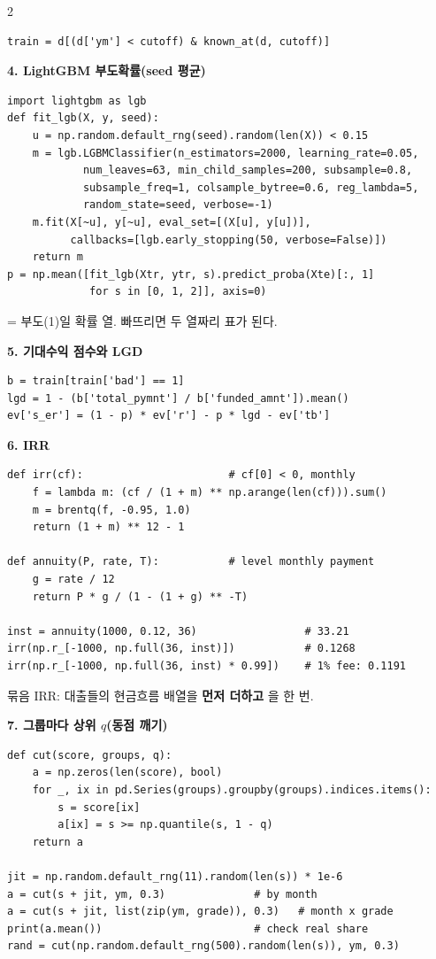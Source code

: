 \documentclass[10pt]{report}
\newcommand{\ft}[1]{\texttt{\detokenize{#1}}}
\newcommand{\Hd}[1]{\par\smallskip\noindent\textbf{#1}\par}
\begin{document}
\begin{multicols}{2}
\begin{lstlisting}
train = d[(d['ym'] < cutoff) & known_at(d, cutoff)]
\end{lstlisting}

\Hd{4. LightGBM 부도확률(seed 평균)}
\begin{lstlisting}
import lightgbm as lgb
def fit_lgb(X, y, seed):
    u = np.random.default_rng(seed).random(len(X)) < 0.15
    m = lgb.LGBMClassifier(n_estimators=2000, learning_rate=0.05,
            num_leaves=63, min_child_samples=200, subsample=0.8,
            subsample_freq=1, colsample_bytree=0.6, reg_lambda=5,
            random_state=seed, verbose=-1)
    m.fit(X[~u], y[~u], eval_set=[(X[u], y[u])],
          callbacks=[lgb.early_stopping(50, verbose=False)])
    return m
p = np.mean([fit_lgb(Xtr, ytr, s).predict_proba(Xte)[:, 1]
             for s in [0, 1, 2]], axis=0)
\end{lstlisting}
\ft{[:, 1]} = 부도(1)일 확률 열. 빠뜨리면 두 열짜리 표가 된다.

\Hd{5. 기대수익 점수와 LGD}
\begin{lstlisting}
b = train[train['bad'] == 1]
lgd = 1 - (b['total_pymnt'] / b['funded_amnt']).mean()
ev['s_er'] = (1 - p) * ev['r'] - p * lgd - ev['tb']
\end{lstlisting}

\Hd{6. IRR}
\begin{lstlisting}
def irr(cf):                       # cf[0] < 0, monthly
    f = lambda m: (cf / (1 + m) ** np.arange(len(cf))).sum()
    m = brentq(f, -0.95, 1.0)
    return (1 + m) ** 12 - 1

def annuity(P, rate, T):           # level monthly payment
    g = rate / 12
    return P * g / (1 - (1 + g) ** -T)

inst = annuity(1000, 0.12, 36)                 # 33.21
irr(np.r_[-1000, np.full(36, inst)])           # 0.1268
irr(np.r_[-1000, np.full(36, inst) * 0.99])    # 1% fee: 0.1191
\end{lstlisting}
묶음 IRR: 대출들의 현금흐름 배열을 \textbf{먼저 더하고} \ft{irr}을 한 번.

\Hd{7. 그룹마다 상위 $q$(동점 깨기)}
\begin{lstlisting}
def cut(score, groups, q):
    a = np.zeros(len(score), bool)
    for _, ix in pd.Series(groups).groupby(groups).indices.items():
        s = score[ix]
        a[ix] = s >= np.quantile(s, 1 - q)
    return a

jit = np.random.default_rng(11).random(len(s)) * 1e-6
a = cut(s + jit, ym, 0.3)              # by month
a = cut(s + jit, list(zip(ym, grade)), 0.3)   # month x grade
print(a.mean())                        # check real share
rand = cut(np.random.default_rng(500).random(len(s)), ym, 0.3)
\end{lstlisting}


\end{multicols}
\end{document}
